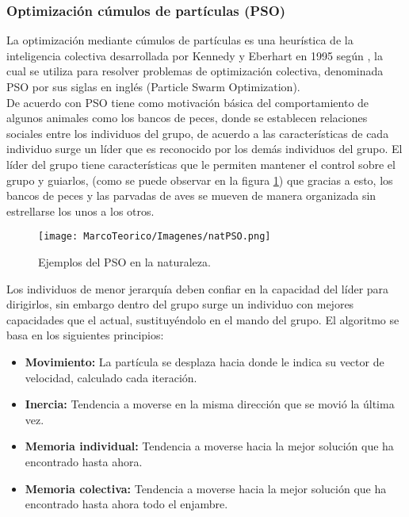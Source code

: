 \subsubsection {Optimización cúmulos de partículas (PSO)}
La optimización mediante cúmulos de partículas es una heurística de la inteligencia colectiva desarrollada por Kennedy y Eberhart en 1995 según \cite{[KENNEDY]},  la cual se utiliza para resolver problemas de optimización colectiva, denominada PSO por sus siglas en inglés (Particle Swarm Optimization).\\
\hspace*{1cm}De acuerdo con \cite{[FLORES]} PSO tiene como motivación básica del comportamiento de algunos animales como los bancos de peces, donde se establecen relaciones sociales entre los individuos del grupo,  de acuerdo a las características de cada individuo surge un líder que es reconocido por los demás individuos del grupo. El líder del grupo tiene características que le permiten mantener el control sobre el grupo y guiarlos, (como se puede observar en la figura \ref{fig:natPSO}) que gracias a esto, los bancos de peces y las parvadas de aves se mueven de manera organizada sin estrellarse los unos a los otros.\\

   \begin{figure}[hbtp]
        \centering
            \texttt{[image: MarcoTeorico/Imagenes/natPSO.png]}
            \caption{Ejemplos del PSO en la naturaleza.}                       
            \label{fig:natPSO}
    \end{figure} 
    
\hspace*{1cm}Los individuos de menor jerarquía deben confiar en la capacidad del líder para dirigirlos, sin embargo dentro del grupo surge un individuo con mejores capacidades que el actual, sustituyéndolo en el mando del grupo. El algoritmo se basa en los siguientes principios:

\begin{itemize}
\item \textbf{Movimiento: }La partícula se desplaza hacia donde le indica su vector de velocidad, calculado cada iteración.
\item \textbf{Inercia: }Tendencia a moverse en la misma dirección que se movió la última vez.
\item \textbf{Memoria individual: }Tendencia a moverse hacia la mejor solución que ha encontrado hasta ahora.
\item \textbf{Memoria colectiva: }Tendencia a moverse hacia la mejor solución que ha encontrado hasta ahora todo el enjambre.
\end{itemize}


